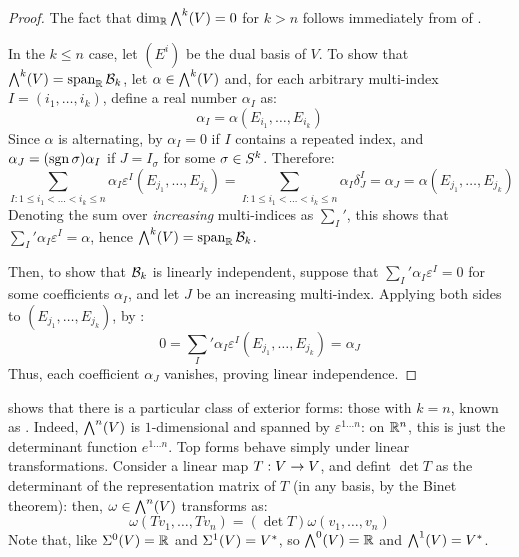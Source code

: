 \begin{proofbox}
  \begin{proof}
    The fact that $ \dim_{\mathbb{R}} {\bigwedge}^{k}(V) = 0 $ for $ k > n $ follows immediately from  of .

    In the $ k \leq n $ case, let $ (E^i) $ be the dual basis of $ V $. To show that $ {\bigwedge}^{k}(V) = \operatorname{span}_{\mathbb{R}} \mathcal{B}_k $, let $ \alpha \in {\bigwedge}^{k}(V) $ and, for each arbitrary multi-index $ I = (i_1 , \dots , i_k) $, define a real number $ \alpha_I $ as:
    \begin{equation*}
      \alpha_I = \alpha(E_{i_1} , \dots , E_{i_k})
    \end{equation*}
    Since $ \alpha $ is alternating, by  $ \alpha_I = 0 $ if $ I $ contains a repeated index, and $ \alpha_J = (\mathrm{sgn}\,\sigma) \alpha_I $ if $ J = I_\sigma $ for some $ \sigma \in S^{k} $. Therefore:
    \begin{equation*}
      \sum_{I : 1 \leq i_1 < \dots < i_k \leq n} \alpha_I \varepsilon^I(E_{j_1} , \dots , E_{j_k}) = \sum_{I : 1 \leq i_1 < \dots < i_k \leq n} \alpha_I \delta^I_J = \alpha_J = \alpha(E_{j_1} , \dots , E_{j_k})
    \end{equation*}
    Denoting the sum over \emph{increasing} multi-indices as $ {\sum_I}' $, this shows that $ {\sum_I}' \alpha_I \varepsilon^I = \alpha $, hence $ {\bigwedge}^{k}(V) = \operatorname{span}_{\mathbb{R}} \mathcal{B}_k $.

    Then, to show that $ \mathcal{B}_k $ is linearly independent, suppose that $ {\sum_I}' \alpha_I \varepsilon^I = 0 $ for some coefficients $ \alpha_I $, and let $ J $ be an increasing multi-index. Applying both sides to $ (E_{j_1} , \dots , E_{j_k}) $, by :
    \begin{equation*}
      0 = {\sum_I}' \alpha_I \varepsilon^I(E_{j_1} , \dots , E_{j_k}) = \alpha_J
    \end{equation*}
    Thus, each coefficient $ \alpha_J $ vanishes, proving linear independence.
  \end{proof}
\end{proofbox}

 shows that there is a particular class of exterior forms: those with $ k = n $, known as . Indeed, $ {\bigwedge}^{n}(V) $ is $ 1 $-dimensional and spanned by $ \varepsilon^{1 \dots n} $: on $ \mathbb{R}^n $, this is just the determinant function $ e^{1 \dots n} $. Top forms behave simply under linear transformations. Consider a linear map $ T : V \rightarrow V $, and defint $ \det T $ as the determinant of the representation matrix of $ T $ (in any basis, by the Binet theorem): then, $ \omega \in {\bigwedge}^{n}(V) $ transforms as:
\begin{equation}
  \omega(T v_1 , \dots , T v_n) = (\det T) \omega(v_1 , \dots , v_n)
  \label{eq:forms-determinant}
\end{equation}
Note that, like $ {\Sigma}^{0}(V) = \mathbb{R} $ and $ {\Sigma}^{1}(V) = V^* $, so $ {\bigwedge}^{0}(V) = \mathbb{R} $ and $ {\bigwedge}^{1}(V) = V^* $.

